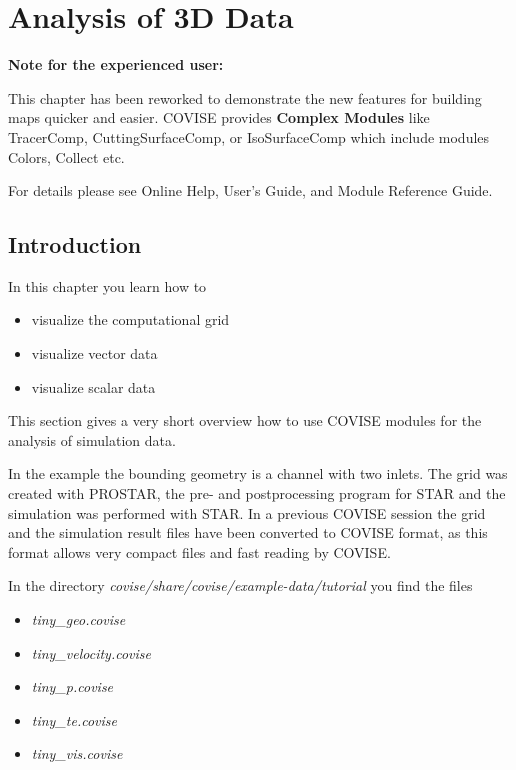 
\begin{htmlonly}

\end{htmlonly}


\startdocument
\chapter{Analysis of 3D Data}
\label{Analysis_of_3D_Data}

{\bf Note for the experienced user:}

This chapter has been reworked to demonstrate the new features for building maps
quicker and easier. COVISE provides {\bf Complex Modules} like TracerComp, 
CuttingSurfaceComp, or IsoSurfaceComp which include modules Colors, Collect etc.

For details please see Online Help, User's Guide, and Module Reference Guide.
 
\section{Introduction}

In this chapter you learn how to

\begin{itemize}
\item visualize the computational grid
\item visualize vector data
\item visualize scalar data
\end{itemize}

This section gives a very short overview how to use COVISE modules for the analysis 
of simulation data.

In the example the bounding geometry is a channel with two inlets. The grid was created 
with PROSTAR, the pre- and postprocessing program for STAR and the simulation was 
performed with STAR. In a previous COVISE session the grid and the simulation result 
files have been converted to COVISE format, as this format allows very compact files
and fast reading by COVISE.

In the directory {\it covise/share/covise/example-data/tutorial} you find the files 

\begin{itemize}
\item {\it tiny\_geo.covise}
\item {\it tiny\_velocity.covise}
\item {\it tiny\_p.covise}
\item {\it tiny\_te.covise}
\item {\it tiny\_vis.covise}
\end{itemize}


